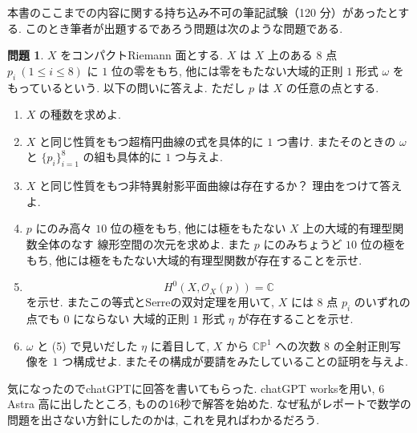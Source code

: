 \documentclass[dvipdfmx,a4paper,11pt]{article} %
\newcommand{\C}{\mathbb{C}}
\theoremstyle{definition}
\numberwithin{equation}{section}
\newtheorem{question}[thm]{問題}
\begin{document}
\begin{tcolorbox}[mybox]


 本書のここまでの内容に関する持ち込み不可の筆記試験（120 分）があったとする. 
 このとき筆者が出題するであろう問題は次のような問題である.

\begin{question}\label{O-M326}
$X$ をコンパクトRiemann 面とする.
$X$ は $X$ 上のある $8$ 点 $p_i\ (1\leq i\leq 8)$ に
$1$ 位の零をもち, 他には零をもたない大域的正則 $1$ 形式
$\omega$ をもっているという.
以下の問いに答えよ.
ただし $p$ は $X$ の任意の点とする.
\begin{enumerate}
\item[(1)]
$X$ の種数を求めよ.

\item[(2)]
$X$ と同じ性質をもつ超楕円曲線の式を具体的に $1$ つ書け.
またそのときの $\omega$ と
$\{p_i\}_{i=1}^8$ の組も具体的に $1$ つ与えよ.

\item[(3)]
$X$ と同じ性質をもつ非特異射影平面曲線は存在するか？
理由をつけて答えよ.

\item[(4)]
$p$ にのみ高々 $10$ 位の極をもち,
他には極をもたない $X$ 上の大域的有理型関数全体のなす
線形空間の次元を求めよ.
また $p$ にのみちょうど $10$ 位の極をもち,
他には極をもたない大域的有理型関数が存在することを示せ.

\item[(5)]
\[
H^0(X,\mathcal O_X(p))=\mathbb C
\]
を示せ.
またこの等式とSerreの双対定理を用いて,
$X$ には $8$ 点 $p_i$ のいずれの点でも $0$ にならない
大域的正則 $1$ 形式 $\eta$ が存在することを示せ.

\item[(6)]
$\omega$ と (5) で見いだした $\eta$ に着目して,
$X$ から $\C\mathbb P^1$ への次数 $8$ の全射正則写像を
$1$ つ構成せよ.
またその構成が要請をみたしていることの証明を与えよ.
\end{enumerate}
\end{question}
\end{tcolorbox}

気になったのでchatGPTに回答を書いてもらった.  chatGPT worksを用い, 6 Astra 高に出したところ, 
ものの16秒で解答を始めた. 
なぜ私がレポートで数学の問題を出さない方針にしたのかは, これを見ればわかるだろう.
\end{document}
